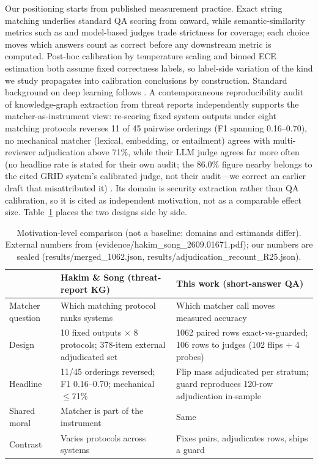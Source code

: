 \documentclass[10pt]{article} %
\begin{document}
Our positioning starts from published measurement practice. Exact string matching underlies standard QA scoring from \citet{rajpurkar2016squad} onward, while semantic-similarity metrics such as \citet{zhang2020bertscore} and model-based judges \citep{zheng2023judging} trade strictness for coverage; each choice moves which answers count as correct before any downstream metric is computed. Post-hoc calibration by temperature scaling \citep{guo2017calibration} and binned ECE estimation \citep{nixon2019measuring} both assume fixed correctness labels, so label-side variation of the kind we study propagates into calibration conclusions by construction. Standard background on deep learning follows \citet{goodfellow2016deep}. A contemporaneous reproducibility audit of knowledge-graph extraction from threat reports independently supports the matcher-as-instrument view: re-scoring fixed system outputs under eight matching protocols reverses 11 of 45 pairwise orderings (F1 spanning 0.16--0.70), no mechanical matcher (lexical, embedding, or entailment) agrees with multi-reviewer adjudication above 71\%, while their LLM judge agrees far more often (no headline rate is stated for their own audit; the 86.0\% figure nearby belongs to the cited GRID system's calibrated judge, not their audit---we correct an earlier draft that misattributed it) \citep{hakim2026ranked}. Its domain is security extraction rather than QA calibration, so it is cited as independent motivation, not as a comparable effect size. Table~\ref{tab:motivation} places the two designs side by side.

\begin{table}[t]
\centering
\small
\begin{tabular}{p{2.0cm}p{4.6cm}p{4.6cm}}
\hline
 & Hakim \& Song (threat-report KG) & This work (short-answer QA) \\
\hline
Matcher question & Which matching protocol ranks systems & Which matcher call moves measured accuracy \\
Design & 10 fixed outputs $\times$ 8 protocols; 378-item external adjudicated set & 1062 paired rows exact-vs-guarded; 106 rows to judges (102 flips + 4 probes) \\
Headline & 11/45 orderings reversed; F1 0.16--0.70; mechanical $\le$71\% & Flip mass adjudicated per stratum; guard reproduces 120-row adjudication in-sample \\
Shared moral & Matcher is part of the instrument & Same \\
Contrast & Varies protocols across systems & Fixes pairs, adjudicates rows, ships a guard \\
\hline
\end{tabular}
\caption{Motivation-level comparison (not a baseline: domains and estimands differ). External numbers from \citet{hakim2026ranked} (evidence/hakim\_song\_2609.01671.pdf); our numbers are sealed (results/merged\_1062.json, results/adjudication\_recount\_R25.json).}
\label{tab:motivation}
\end{table}
\end{document}
